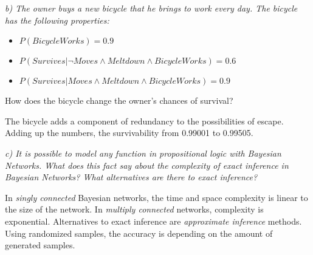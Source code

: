 \em b) The owner buys a new bicycle that he brings to work every day. The bicycle has the following properties:
\begin{itemize}
  \item $P(BicycleWorks) = 0.9$
  \item $P(Survives | \neg Moves \land Meltdown \land BicycleWorks) = 0.6$
  \item $P(Survives | Moves \land Meltdown \land BicycleWorks) = 0.9$
\end{itemize}
How does the bicycle change the owner's chances of survival? \em

The bicycle adds a component of redundancy to the possibilities of escape. Adding up the numbers, the survivability from 0.99001 to 0.99505.

\em c) It is possible to model any function in propositional logic with Bayesian Networks. What does this fact say about the complexity of exact inference in Bayesian Networks? What alternatives are there to exact inference? \em

In \emph{singly connected} Bayesian networks, the time and space complexity is linear to the size of the network. In \emph{multiply connected} networks, complexity is exponential. Alternatives to exact inference are \emph{approximate inference} methods. Using randomized samples, the accuracy is depending on the amount of generated samples.
